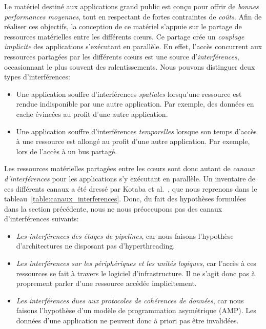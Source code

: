 Le matériel destiné aux applications grand public est conçu pour offrir de \emph{bonnes performances moyennes}, tout en respectant de fortes contraintes de \emph{coûts}.
Afin de réaliser ces objectifs, la conception de ce matériel s'appuie sur le partage de ressources matérielles entre les différents cœurs.
Ce partage crée un \emph{couplage implicite} des applications s'exécutant en parallèle.
En effet, l'accès concurrent aux ressources partagées par les différents cœurs est une source d'\emph{interférences}, occasionnant le plus souvent des ralentissements.
Nous pouvons distinguer deux types d'interférences:
\begin{itemize}
	\item Une application souffre d'interférences \emph{spatiales} lorsqu'une ressource est rendue indisponible par une autre application.
	Par exemple, des données en cache évincées au profit d'une autre application.

	\item Une application souffre d'interférences \emph{temporelles} lorsque son temps d'accès à une ressource est allongé au profit d'une autre application.
	Par exemple, lors de l'accès à un bus partagé.
\end{itemize}

Les ressources matérielles partagées entre les cœurs sont donc autant de \emph{canaux d'interférences} pour les applications s'y exécutant en parallèle.
Un inventaire de ces différents canaux a été dressé par Kotaba et al.~\cite{kotaba2013multicore}, que nous reprenons dans le tableau~\ref{table:canaux_interferences}.
Donc, du fait des hypothèses formulées dans la section précédente, nous ne nous préoccupons pas des canaux d'interférences suivants:
\begin{itemize}
	\item \emph{Les interférences des étages de pipelines}, car nous faisons l'hypothèse d'architectures ne disposant pas d'hyperthreading.
	\item \emph{Les interférences sur les périphériques et les unités logiques}, car l'accès à ces ressources se fait à travers le logiciel d'infrastructure.
	Il ne s'agit donc pas à proprement parler d'une ressource accédée implicitement.
	\item \emph{Les interférences dues aux protocoles de cohérences de données}, car nous faisons l'hypothèse d'un modèle de programmation asymétrique (AMP).
	Les données d'une application ne peuvent donc à priori pas être invalidées.
\end{itemize}

